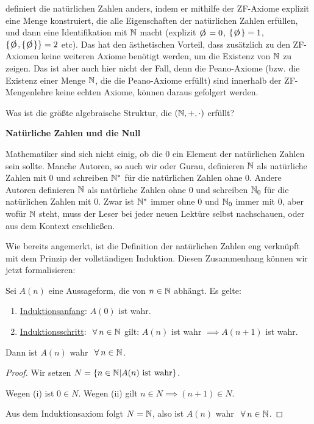 \begin{remark}
    \cite{GURAU} definiert die natürlichen Zahlen anders, indem er mithilfe der ZF-Axiome explizit eine Menge konstruiert, die alle Eigenschaften der natürlichen Zahlen erfüllen, und dann eine Identifikation mit $\mathbb{N}$ macht (explizit $\e = 0$, $\{\e\} = 1$, $\{ \e, \{\e\}\} = 2$ etc). Das hat den ästhetischen Vorteil, dass zusätzlich zu den ZF-Axiomen keine weiteren Axiome benötigt werden, um die Existenz von $\mathbb{N}$ zu zeigen. Das ist aber auch hier nicht der Fall, denn die Peano-Axiome (bzw. die Existenz einer Menge $\mathbb{N}$, die die Peano-Axiome erfüllt) sind innerhalb der ZF-Mengenlehre keine echten Axiome, können daraus gefolgert werden.
\end{remark}

\begin{exercise}
    \label{exercise-structure-of-n}
    Was ist die größte algebraische Struktur, die $(\mathbb{N}, +, \cdot)$ erfüllt?
\end{exercise}

\begin{remark}
    \textbf{Natürliche Zahlen und die Null}

    Mathematiker sind sich nicht einig, ob die $0$ ein Element der natürlichen Zahlen sein sollte. Manche Autoren, so auch wir oder Gurau, definieren $\mathbb{N}$ als natürliche Zahlen mit $0$ und schreiben $\mathbb{N}^*$ für die natürlichen Zahlen ohne $0$. Andere Autoren definieren $\mathbb{N}$ als natürliche Zahlen ohne $0$ und schreiben $\mathbb{N}_0$ für die natürlichen Zahlen mit $0$. Zwar ist $\mathbb{N}^*$ immer ohne $0$ und $\mathbb{N}_0$ immer mit $0$, aber wofür $\mathbb{N}$ steht, muss der Leser bei jeder neuen Lektüre selbst nachschauen, oder aus dem Kontext erschließen.
\end{remark}

Wie bereits angemerkt, ist die Definition der natürlichen Zahlen eng verknüpft mit dem Prinzip der vollständigen Induktion. Diesen Zusammenhang können wir jetzt formalisieren:

\begin{theorem}
    \label{theorem-natural-induction}
    Sei $A(n)$ eine Aussageform, die von $n \in \mathbb{N}$ abhängt. Es gelte:
    \begin{enumerate}
        \item \underline{Induktionsanfang}: $A(0)$ ist wahr.
        \item \underline{Induktionsschritt}: $\forall n \in \N$ gilt: $A(n)$ ist wahr $\implies A(n+1)$ ist wahr.
    \end{enumerate}
    Dann ist $A(n)$ wahr $\forall n \in \N$.
\end{theorem}
\begin{proof}
    Wir setzen $N = \{n \in \mathbb{N} | A(n) \text{ ist wahr}\}$.
    
    Wegen (i) ist $0 \in N$. Wegen (ii) gilt $n \in N \implies (n+1) \in N$.

    Aus dem Induktionsaxiom folgt $N = \mathbb{N}$, also ist $A(n)$ wahr $\forall n \in \N$.
\end{proof}

